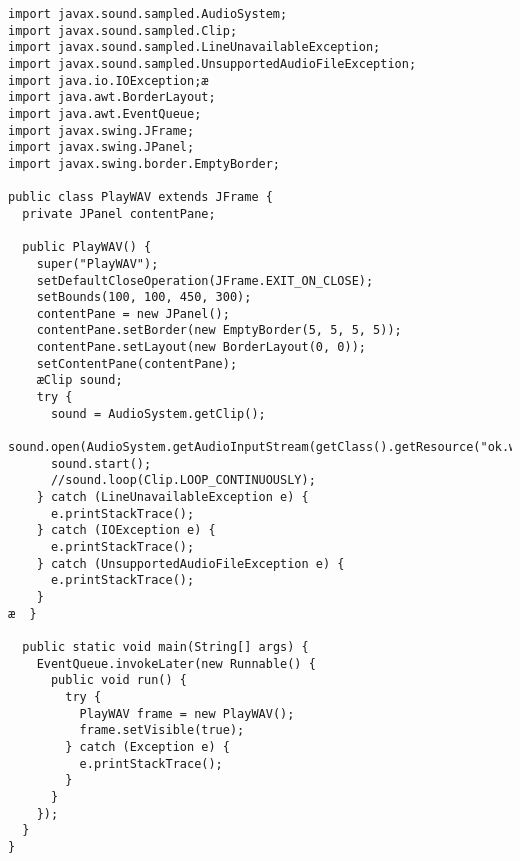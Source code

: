 \begin{lstlisting}
import javax.sound.sampled.AudioSystem;
import javax.sound.sampled.Clip;
import javax.sound.sampled.LineUnavailableException;
import javax.sound.sampled.UnsupportedAudioFileException;
import java.io.IOException;æ
import java.awt.BorderLayout;
import java.awt.EventQueue;
import javax.swing.JFrame;
import javax.swing.JPanel;
import javax.swing.border.EmptyBorder;

public class PlayWAV extends JFrame {
  private JPanel contentPane;

  public PlayWAV() {
    super("PlayWAV");
    setDefaultCloseOperation(JFrame.EXIT_ON_CLOSE);
    setBounds(100, 100, 450, 300);
    contentPane = new JPanel();
    contentPane.setBorder(new EmptyBorder(5, 5, 5, 5));
    contentPane.setLayout(new BorderLayout(0, 0));
    setContentPane(contentPane);
    æClip sound;
    try {
      sound = AudioSystem.getClip();
      sound.open(AudioSystem.getAudioInputStream(getClass().getResource("ok.wav")));
      sound.start();
      //sound.loop(Clip.LOOP_CONTINUOUSLY);
    } catch (LineUnavailableException e) {
      e.printStackTrace();
    } catch (IOException e) {
      e.printStackTrace();
    } catch (UnsupportedAudioFileException e) {
      e.printStackTrace();
    }
æ  }

  public static void main(String[] args) {
    EventQueue.invokeLater(new Runnable() {
      public void run() {
        try {
          PlayWAV frame = new PlayWAV();
          frame.setVisible(true);
        } catch (Exception e) {
          e.printStackTrace();
        }
      }
    });
  }
}
\end{lstlisting}



